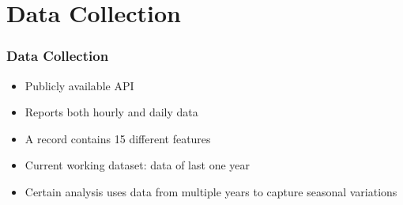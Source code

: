 \section{Data Collection}
\begin{frame}
\frametitle{Data Collection}
\begin{itemize}
\setlength\itemsep{1em}
\item Publicly available API
\item Reports both hourly and daily data
\item A record contains 15 different features
\item Current working dataset: data of last one year
\item Certain analysis uses data from multiple years to capture seasonal variations
\end{itemize}
\end{frame}
